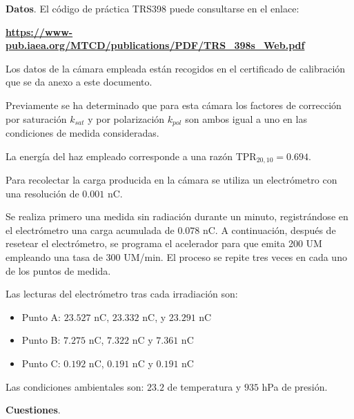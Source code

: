 \documentclass[a4paper,12pt]{article} %
\begin{document}
\textbf{Datos}.
El código de práctica TRS398 puede consultarse en el enlace:

\noindent \textbf{\url{https://www-pub.iaea.org/MTCD/publications/PDF/TRS_398s_Web.pdf}}

Los datos de la cámara empleada están recogidos en el certificado de calibración que se da anexo a este documento.

Previamente se ha determinado que para esta cámara los factores de corrección por saturación $k_{sat}$ y por polarización $k_{pol}$ son ambos igual a uno en las condiciones de medida consideradas.

La energía del haz empleado corresponde a una razón TPR${}_{20, 10} = 0.694$.

Para recolectar la carga producida en la cámara se utiliza un electrómetro con una resolución de $0.001$ nC.

Se realiza primero una medida sin radiación durante un minuto, registrándose en el electrómetro una carga acumulada de $0.078$ nC. A continuación, después de resetear el electrómetro, se programa el acelerador para que emita 200 UM empleando una tasa de 300 UM/min. El proceso se repite tres veces en cada uno de los puntos de medida.

Las lecturas del electrómetro tras cada irradiación son:

\begin{itemize}
    \item Punto A: $23.527$ nC, $23.332$ nC, y $23.291$ nC
    \item Punto B: $7.275$ nC, $7.322$ nC y $7.361$ nC
    \item Punto C: $0.192$ nC, $0.191$ nC y $0.191$ nC
\end{itemize}

Las condiciones ambientales son: $23.2$\textcelsius{} de temperatura y $935$ hPa de presión.

{\bf Cuestiones}.
\end{document}
